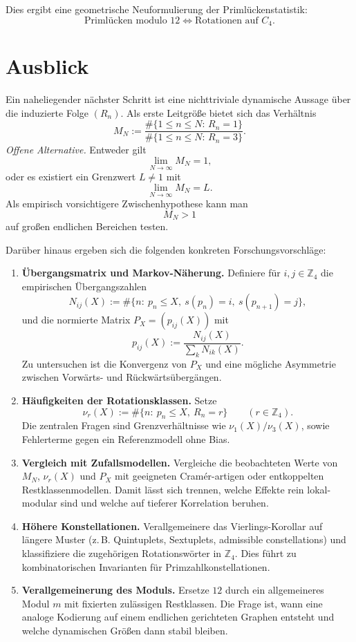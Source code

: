 \documentclass[11pt]{article}
\theoremstyle{definition}
\begin{document}
Dies ergibt eine geometrische Neuformulierung der Priml\"uckenstatistik:
\[
\boxed{
\text{Priml\"ucken modulo }12
\Longleftrightarrow
\text{Rotationen auf }C_4.
}
\]

\section{Ausblick}

Ein naheliegender n\"achster Schritt ist eine nichttriviale dynamische Aussage \"uber die induzierte Folge $(R_n)$. Als erste Leitgr\"o{\ss}e bietet sich das Verh\"altnis
\[
M_N
:=
\frac{\#\{1\le n\le N:\,R_n=1\}}
{\#\{1\le n\le N:\,R_n=3\}}.
\]
\emph{Offene Alternative.} Entweder gilt
\[
\lim_{N\to\infty} M_N = 1,
\]
oder es existiert ein Grenzwert $L\neq1$ mit
\[
\lim_{N\to\infty} M_N = L.
\]
Als empirisch vorsichtigere Zwischenhypothese kann man
\[
M_N>1
\]
auf gro{\ss}en endlichen Bereichen testen.

Dar\"uber hinaus ergeben sich die folgenden konkreten Forschungsvorschl\"age:
\begin{enumerate}[label=\textbf{F\arabic*:},leftmargin=*,itemsep=0.35em]
\item \textbf{\"Ubergangsmatrix und Markov-N\"aherung.}
Definiere f\"ur $i,j\in\mathbb{Z}_4$ die empirischen \"Ubergangszahlen
\[
N_{ij}(X):=\#\{n:\ p_n\le X,\ s(p_n)=i,\ s(p_{n+1})=j\},
\]
und die normierte Matrix $P_X=(p_{ij}(X))$ mit
\[
p_{ij}(X):=\frac{N_{ij}(X)}{\sum_{k}N_{ik}(X)}.
\]
Zu untersuchen ist die Konvergenz von $P_X$ und eine m\"ogliche Asymmetrie zwischen Vorw\"arts- und R\"uckw\"arts\"uberg\"angen.

\item \textbf{H\"aufigkeiten der Rotationsklassen.}
Setze
\[
\nu_r(X):=\#\{n:\ p_n\le X,\ R_n=r\}\qquad (r\in\mathbb{Z}_4).
\]
Die zentralen Fragen sind Grenzverh\"altnisse wie $\nu_1(X)/\nu_3(X)$, sowie Fehlerterme gegen ein Referenzmodell ohne Bias.

\item \textbf{Vergleich mit Zufallsmodellen.}
Vergleiche die beobachteten Werte von $M_N$, $\nu_r(X)$ und $P_X$ mit
geeigneten Cram\'er-artigen oder entkoppelten Restklassenmodellen.
Damit l\"asst sich trennen, welche Effekte rein lokal-modular sind und welche auf tieferer Korrelation beruhen.

\item \textbf{H\"ohere Konstellationen.}
Verallgemeinere das Vierlings-Korollar auf l\"angere Muster (z.\,B. Quintuplets,
Sextuplets, admissible constellations) und klassifiziere die zugeh\"origen
Rotationsw\"orter in $\mathbb{Z}_4$.
Dies f\"uhrt zu kombinatorischen Invarianten f\"ur Primzahlkonstellationen.

\item \textbf{Verallgemeinerung des Moduls.}
Ersetze $12$ durch ein allgemeineres Modul $m$ mit fixierten zul\"assigen Restklassen.
Die Frage ist, wann eine analoge Kodierung auf einem endlichen gerichteten Graphen
entsteht und welche dynamischen Gr\"o{\ss}en dann stabil bleiben.
\end{enumerate}
\end{document}
